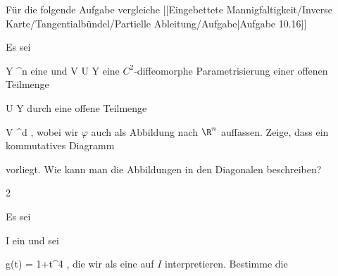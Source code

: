 Für die folgende Aufgabe vergleiche
[[Eingebettete Mannigfaltigkeit/Inverse Karte/Tangentialbündel/Partielle Ableitung/Aufgabe|Aufgabe 10.16]]

{}
{

Es sei

\mavergleichskette
{\vergleichskette
{ Y
}
{ \subseteq }{ \R^n
}
{  }{
}
{    }{
}
{   }{
}
}
{}{}{}
eine
und
\maabb {\varphi} { V } { U \subseteq Y
} {}
eine $C^2$-diffeomorphe Parametrisierung einer offenen Teilmenge

\mavergleichskette
{\vergleichskette
{ U
}
{ \subseteq }{ Y
}
{  }{
}
{    }{
}
{   }{
}
}
{}{}{}
durch eine offene Teilmenge

\mavergleichskette
{\vergleichskette
{ V
}
{ \subseteq }{ \R^d
}
{  }{
}
{    }{
}
{   }{
}
}
{}{}{,}
wobei wir $\varphi$ auch als Abbildung nach $\R^n$ auffassen. Zeige, dass ein kommutatives Diagramm

 {  }

vorliegt. Wie kann man die Abbildungen in den Diagonalen beschreiben?

}
{} {}


{2}
{

Es sei

\mavergleichskette
{\vergleichskette
{ I
}
{ \subseteq }{ \R
}
{  }{
}
{    }{
}
{   }{
}
}
{}{}{}
ein
und sei

\mavergleichskettedisp
{\vergleichskette
{ g(t)
}
{ =} { 1+t^4
}
{ } {
}
{ } {
}
{ } {
}
}
{}{}{,}
die wir als eine
auf $I$ interpretieren. Bestimme die
 {} {}


}
{} {}

